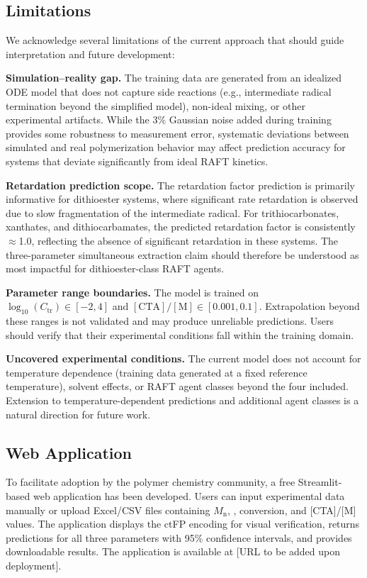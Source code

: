 \documentclass[journal=mamobx,manuscript=article]{achemso}
\begin{document}
\subsection{Limitations}

We acknowledge several limitations of the current approach that should guide interpretation and future development:

\textbf{Simulation--reality gap.} The training data are generated from an idealized ODE model that does not capture side reactions (e.g., intermediate radical termination beyond the simplified model), non-ideal mixing, or other experimental artifacts. While the 3\% Gaussian noise added during training provides some robustness to measurement error, systematic deviations between simulated and real polymerization behavior may affect prediction accuracy for systems that deviate significantly from ideal RAFT kinetics.

\textbf{Retardation prediction scope.} The retardation factor prediction is primarily informative for dithioester systems, where significant rate retardation is observed due to slow fragmentation of the intermediate radical.\cite{BarnerKowollik2006} For trithiocarbonates, xanthates, and dithiocarbamates, the predicted retardation factor is consistently $\approx$1.0, reflecting the absence of significant retardation in these systems. The three-parameter simultaneous extraction claim should therefore be understood as most impactful for dithioester-class RAFT agents.

\textbf{Parameter range boundaries.} The model is trained on $\log_{10}(C_\mathrm{tr}) \in [-2, 4]$ and $[\mathrm{CTA}]/[\mathrm{M}] \in [0.001, 0.1]$. Extrapolation beyond these ranges is not validated and may produce unreliable predictions. Users should verify that their experimental conditions fall within the training domain.

\textbf{Uncovered experimental conditions.} The current model does not account for temperature dependence (training data generated at a fixed reference temperature), solvent effects, or RAFT agent classes beyond the four included. Extension to temperature-dependent predictions and additional agent classes is a natural direction for future work.

\subsection{Web Application}

To facilitate adoption by the polymer chemistry community, a free Streamlit-based web application has been developed. Users can input experimental data manually or upload Excel/CSV files containing $M_\mathrm{n}$, \DJ, conversion, and [CTA]/[M] values. The application displays the ctFP encoding for visual verification, returns predictions for all three parameters with 95\% confidence intervals, and provides downloadable results. The application is available at [URL to be added upon deployment].
\end{document}

